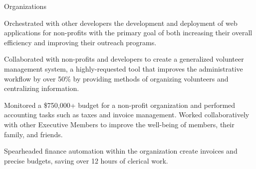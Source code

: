 \documentclass{resume} %
\begin{document}
\begin{workSection}{Organizations}
    \customItem[
        title=Bits of Good,
        keyHighlight=Developer,
        duration=January 2023 - Present,
        location=Atlanta{,} GA
    ]
     \begin{bullets}
       \item Orchestrated with other developers the development and deployment of web applications for non-profits with the primary goal of both increasing their overall efficiency and improving their outreach programs.
       \item Collaborated with non-profits and developers to create a generalized volunteer management system, a highly-requested tool that improves the administrative workflow by over 50\% by providing methods of organizing volunteers and centralizing information.

     \end{bullets}
    \customItem[
        title=Delta Chi Fraternity,
        keyHighlight=Treasurer{,} Technology Chair,
        duration=August 2021 - Present,
        location=Atlanta{,} GA
    ]
    \begin{bullets}
        \item Monitored a \$750,000+ budget for a non-profit organization and performed accounting tasks such as taxes and invoice management. Worked collaboratively with other Executive Members to improve the well-being of members, their family, and friends.
        \item Spearheaded finance automation within the organization create invoices and precise budgets, saving over 12 hours of clerical work.
    \end{bullets}
     
     
\end{workSection}
\end{document}
